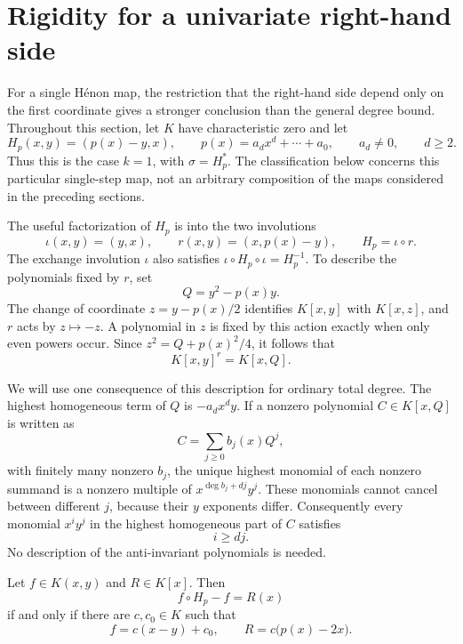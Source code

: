 \section{Rigidity for a univariate right-hand side}
\label{sec:univariate-rigidity}

For a single H\'enon map, the restriction that the right-hand side depend
only on the first coordinate gives a stronger conclusion than the general
degree bound. Throughout this section, let $K$ have characteristic zero and
let
\[
 H_p(x,y)=(p(x)-y,x),\qquad
 p(x)=a_dx^d+\cdots+a_0,\qquad a_d\ne0,\qquad d\ge2.
\]
Thus this is the case $k=1$, with $\sigma=H_p^*$. The classification below
concerns this particular single-step map, not an arbitrary composition of
the maps considered in the preceding sections.

The useful factorization of $H_p$ is into the two involutions
\[
 \iota(x,y)=(y,x),\qquad
 r(x,y)=(x,p(x)-y),\qquad H_p=\iota\circ r.
\]
The exchange involution $\iota$ also satisfies
$\iota\circ H_p\circ\iota=H_p^{-1}$. To describe the polynomials fixed by
$r$, set
\[
 Q=y^2-p(x)y.
\]
The change of coordinate $z=y-p(x)/2$ identifies $K[x,y]$ with $K[x,z]$,
and $r$ acts by $z\mapsto-z$. A polynomial in $z$ is fixed by this action
exactly when only even powers occur. Since
$z^2=Q+p(x)^2/4$, it follows that
\begin{equation}
 K[x,y]^r=K[x,Q].
 \label{eq:reflection-invariant-ring}
\end{equation}

We will use one consequence of this description for ordinary total degree.
The highest homogeneous term of $Q$ is $-a_dx^dy$. If a nonzero polynomial
$C\in K[x,Q]$ is written as
\[
 C=\sum_{j\ge0}b_j(x)Q^j,
\]
with finitely many nonzero $b_j$, the unique highest monomial of each nonzero
summand is a nonzero multiple of
$x^{\deg b_j+dj}y^j$. These monomials cannot cancel between different $j$,
because their $y$ exponents differ. Consequently every monomial $x^iy^j$
in the highest homogeneous part of $C$ satisfies
\begin{equation}
 i\ge dj.
 \label{eq:invariant-highest-cone}
\end{equation}
No description of the anti-invariant polynomials is needed.

\begin{theorem}
\label{thm:univariate}
Let $f\in K(x,y)$ and $R\in K[x]$. Then
\[
 f\circ H_p-f=R(x)
\]
if and only if there are $c,c_0\in K$ such that
\begin{equation}
 f=c(x-y)+c_0,\qquad R=c\bigl(p(x)-2x\bigr).
 \label{eq:univariate-classification}
\end{equation}
\end{theorem}

